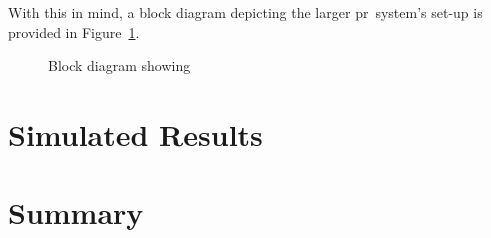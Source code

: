 \documentclass[class=report,11pt,crop=false]{standalone}
\begin{document}
With this in mind, a block diagram depicting the larger \gls{pr}~system's set-up is provided in Figure~\ref{fig:BD_pr-integration}.

\begin{figure}[htbp]
    \centering
    \captionsetup{type=figure}
    \def\svgwidth{\linewidth}
    { %
    \scriptsize
    }
    \caption{Block diagram showing }
    \label{fig:BD_pr-integration}
\end{figure}


\section{Simulated Results}

\section{Summary}

\ifstandalone

\printnoidxglossary[type=\acronymtype,nonumberlist]
\fi
\end{document}
